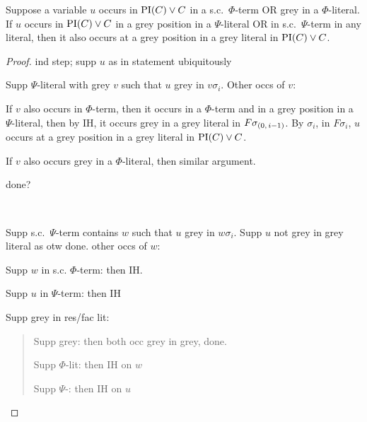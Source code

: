 \documentclass[,%
	draft=false,%
	numbers=noendperiod
	12pt,
	a4paper,
	oneside,%
	openany,
]{memoir}
\begin{document}
\begin{clemma}
	\label{last_lemma}
	Suppose a variable $u$ occurs  in $\operatorname{PI}(C) \lor C$ in a s.c.\ $\Phi$-term OR grey in a $\Phi$-literal.
	If $u$ occurs in $\operatorname{PI}(C) \lor C$ in a grey position in a $\Psi$-literal OR in s.c.\ $\Psi$-term in any literal, then it also occurs at a grey position in a grey literal in $\operatorname{PI}(C) \lor C$.
\end{clemma}
\begin{proof}
	ind step; supp $u$ as in statement ubiquitously

	Supp $\Psi$-literal with grey $v$ such that $u$ grey in $v\sigma_i$.
	Other occs of $v$:

	If $v$ also occurs in $\Phi$-term, then it occurs in a $\Phi$-term and in a grey position in a $\Psi$-literal, then by IH, it occurs grey in a grey literal in $F\sigma_{(0,\,i-1)}$.
	By $\sigma_i$, in $F\sigma_i$, $u$ occurs at a grey position in a grey literal in $\operatorname{PI}(C) \lor C$.

	If $v$ also occurs grey in a $\Phi$-literal, then similar argument.

	done?

	~

	Supp s.c.\ $\Psi$-term contains $w$ such that $u$ grey in $w\sigma_i$.
	Supp $u$ not grey in grey literal as otw done.
	other occs of $w$:

	Supp $w$ in s.c. $\Phi$-term: then IH.

	Supp $u$ in $\Psi$-term: then IH

	Supp grey in res/fac lit:
	\begin{quote}
		Supp grey: then both occ grey in grey, done.

		Supp $\Phi$-lit: then IH on $w$

		Supp $\Psi$-: then IH on $u$
	\end{quote}

\end{proof}
\end{document}
